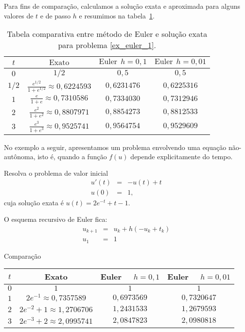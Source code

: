 Para fins de comparação, calculamos a solução exata e aproximada para alguns valores de $t$ e de passo $h$ e resumimos na tabela~\ref{tab:log}.

\begin{table}
  \caption{Tabela comparativa entre método de Euler e solução exata para problema \ref{ex_euler_1}.}
  \label{tab:log}
  \begin{tabular}{|c|c|c|c|}\hline
    $t$ & $\text{Exato}$ & $\text{Euler}~~ h=0,1$ & $\text{Euler}~~ h=0,01$\\\hline
    $0$ & $1/2$ & $0,5$ & $0,5$\\\hline
    $1/2$ & $\frac{e^{1/2}}{1+e^{1/2}}\approx 0,6224593$ & $0,6231476$ & $0,6225316$\\\hline
    $1$ & $\frac{e}{1+e}\approx 0,7310586$ & $0,7334030$ & $0,7312946$\\\hline
    $2$ & $\frac{e^2}{1+e^2}\approx  0,8807971$ & $0,8854273$  & $0,8812533$ \\\hline
    $3$ & $\frac{e^3}{1+e^3}\approx   0,9525741$  & $0,9564754$ & $0,9529609$ \\\hline
  \end{tabular}
\end{table}


No exemplo a seguir, apresentamos um problema envolvendo uma equação não-autônoma, isto é, quando a função $f(u)$ depende explicitamente do tempo.

\begin{ex}
Resolva o problema de valor inicial
  \begin{eqnarray*}
    u'(t)&=&-u(t)+t\\
    u(0)&=&1,
  \end{eqnarray*}
cuja solução exata é $u(t)=2e^{-t}+t-1$.
\end{ex}
O esquema recursivo de Euler fica:
\begin{eqnarray*}
  u_{k+1}&=&u_k+h(-u_k+t_k)\\
  u_1&=&1
\end{eqnarray*}

Comparação
\begin{center}
\begin{tabular}{|c|c|c|c|}\hline
$t$ &  Exato & Euler~~ $h=0,1$ & Euler~~ $h=0,01$\\\hline
$0$ &  $1$ & $1$ & $1$\\\hline
$1$ &   $2e^{-1}\approx 0,7357589$ & $0,6973569$   &   $0,7320647$  \\\hline
$2$ &   $2e^{-2}+1\approx  1,2706706$ & $ 1,2431533 $   &  $ 1,2679593$     \\\hline
$3$ &   $2e^{-3}+2\approx 2,0995741$  & $ 2,0847823$ & $2,0980818$   \\\hline
\end{tabular}
\end{center}

